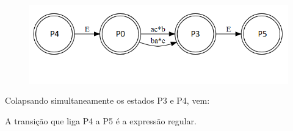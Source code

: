 \documentclass[a4paper,10pt]{article} %
\begin{document}
\begin{itemize}
        \begin{center}
            \begin{figure}[!htb]
                \includegraphics[scale = 1]{Figura_ex15.png}
            \end{figure}
        \end{center}
            Colapsando simultaneamente os estados P3 e P4, vem:
            \begin{center}
            \end{center}

    \end{itemize}
    A transição que liga P4 a P5 é a expressão regular.
\end{document}
